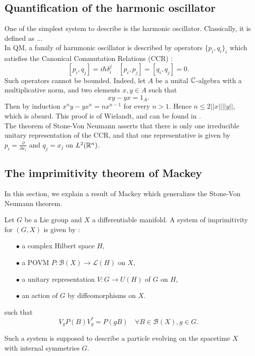 \subsection{Quantification of the harmonic oscillator}

One of the simplest system to describe is the harmonic oscillator. Classically, it is defined as ...\\

In QM, a family of harnmonic oscillator is described by operators $\{p_i , q_i\}_i$ which satisfies the Canonical Commutation Relations (CCR) :
\[[p_i,q_j ] = i\hbar \delta_i^j \quad [p_i,p_j]=[q_i,q_j]=0.\]
Such operators cannot be bounded. Indeed, let $A$ be a unital $\mathbb C$-algebra with a multiplicative norm, and two elements $x,y\in A$ such that
\[xy-yx = 1_A.\]
Then by induction $x^ny-yx^n = nx^{n-1}$ for every $n>1$. Hence $n \leq 2 || x || || y||$, which is absurd. This proof is of Wielandt, and can be found in \cite{Rudin}.\\

The theorem of Stone-Von Neumann asserts that there is only one irreducible unitary representation of the CCR, and that one representative is given by $p_i=\frac{\partial }{\partial x_i}$ and $q_j= x_j$ on $L^2(\mathbb R^n)$.

\subsection{The imprimitivity theorem of Mackey}

In this section, we explain a result of Mackey which generalizes the Stone-Von Neumann theorem.

\begin{definition}
Let $G$ be a Lie group and $X$ a differentiable manifold. A system of imprimitivity for $(G,X)$ is given by :
\begin{itemize}
\item[$\bullet$] a complex Hilbert space $H$,
\item[$\bullet$] a POVM $P: \mathcal B(X)\rightarrow \mathcal L(H)$ on $X$,
\item[$\bullet$] a unitary representation $V:G\rightarrow U(H)$ of $G$ on $H$,
\item[$\bullet$] an action of $G$ by diffeomorphisms on $X$.
\end{itemize}
such that \[V_g P(B)V_g^* = P( g B)\quad \forall B \in\mathcal B(X),g\in G. \]
\end{definition}

\begin{rk} Such a system is supposed to describe a particle evolving on the spacetime $X$ with internal symmetries $G$.
\end{rk}

